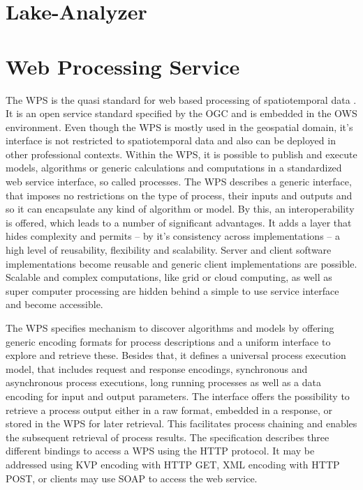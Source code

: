 \chapter{Lake-Analyzer}
\chapter{Web Processing Service}
	\label{sec:wps}
	The \ac{WPS} \citep{ogc:wps} is the quasi standard for web based processing of spatiotemporal data \citep{foerster2012live}. It is an open service standard specified by the \ac{OGC} and is embedded in the \ac{OWS} environment. Even though the \ac{WPS} is mostly used in the geospatial domain, it's interface is not restricted to spatiotemporal data and also can be deployed in other professional contexts. Within the WPS, it is possible to publish and execute models, algorithms or generic calculations and computations in a standardized web service interface, so called processes. The \ac{WPS} describes a generic interface, that imposes no restrictions on the type of process, their inputs and outputs and so it can encapsulate any kind of algorithm or model. By this, an interoperability is offered, which leads to a number of significant advantages. It adds a layer that hides complexity and permits -- by it's consistency across implementations -- a high level of reusability, flexibility and scalability. Server and client software implementations become reusable and generic client implementations are possible. Scalable and complex computations, like grid or cloud computing, as well as super computer processing are hidden behind a simple to use service interface and become accessible.

	The \ac{WPS} specifies mechanism to discover algorithms and models by offering generic encoding formats for process descriptions and a uniform interface to explore and retrieve these. Besides that, it defines a universal process execution model, that includes request and response encodings, synchronous and asynchronous process executions, long running processes as well as a data encoding for input and output parameters. The interface offers the possibility to retrieve a process output either in a raw format, embedded in a response, or stored in the \ac{WPS} for later retrieval. This facilitates process chaining and enables the subsequent retrieval of process results. The specification describes three different bindings to access a \ac{WPS} using the HTTP protocol. It may be addressed using \ac{KVP} encoding with HTTP GET, XML encoding with HTTP POST, or clients may use SOAP \citep{w3c:soap1} to access the web service.

